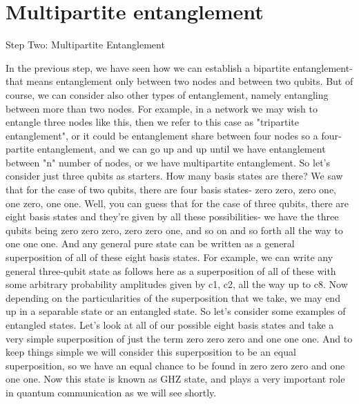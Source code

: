\section{Multipartite entanglement}

Step Two: Multipartite Entanglement

In the previous step, we have seen how we can establish a bipartite entanglement- that means entanglement only between two nodes and between two qubits. But of course, we can consider also other types of entanglement, namely entangling between more than two nodes. For example, in a network we may wish to entangle three nodes like this, then we refer to this case as "tripartite entanglement", or it could be entanglement share between four nodes so a four-partite entanglement, and we can go up and up until we have entanglement between "n" number of nodes, or we have multipartite entanglement. So let's consider just three qubits as starters. How many basis states are there? We saw that for the case of two qubits, there are four basis states- zero zero, zero one, one zero, one one. Well, you can guess that for the case of three qubits, there are eight basis states and they're given by all these possibilities- we have the three qubits being zero zero zero, zero zero one, and so on and so forth all the way to one one one. And any general pure state can be written as a general superposition of all of these eight basis states. For example, we can write any general three-qubit state as follows here as a superposition of all of these with some arbitrary probability amplitudes given by c1, c2, all the way up to c8. Now depending on the particularities of the superposition that we take, we may end up in a separable state or an entangled state. So let's consider some examples of entangled states. Let's look at all of our possible eight basis states and take a very simple superposition of just the term zero zero zero and one one one. And to keep things simple we will consider this superposition to be an equal superposition, so we have an equal chance to be found in zero zero zero and one one one. Now this state is known as GHZ state, and plays a very important role in quantum communication as we will see shortly.

